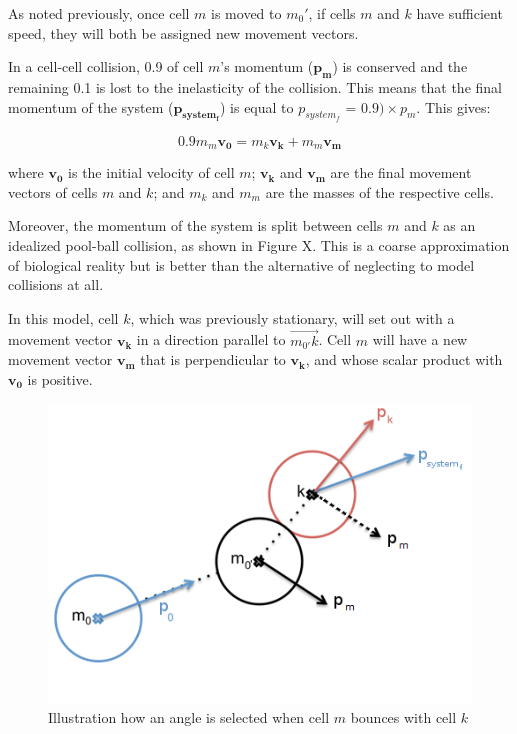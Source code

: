 \documentclass[12pt]{article}
\begin{document}
As noted previously, once cell \(m\) is moved to \(m_0'\), if 
cells \(m\) and \(k\) have sufficient speed, they will both be assigned new movement vectors.

In a cell-cell collision, 0.9 of cell \(m\)'s momentum (\(\mathbf{p_m}\)) is conserved and the 
remaining 0.1 is lost to the inelasticity of the collision. This means that the final momentum 
of the system (\(\mathbf{p_{system_f}}\)) is equal to \(p_{system_f}\) = \(0.9) \times p_m\). 
This gives:

\begin{equation}
  0.9m_m\mathbf{v_0} = m_k\mathbf{v_k}+m_m\mathbf{v_m}
\end{equation}

where \(\mathbf{v_0}\) is the initial velocity of cell \(m\);
\(\mathbf{v_k}\) and \(\mathbf{v_m}\) are the final movement vectors of cells \(m\) and \(k\); and \(m_k\) and
\(m_m\) are the masses of the respective cells.

Moreover, the momentum of the system is split between cells \(m\) and \(k\) as an idealized 
pool-ball collision, as shown in Figure X. This is a coarse approximation of biological 
reality but is better than the alternative of neglecting to model collisions at all. 

In this model, cell \(k\), which was previously stationary, will 
set out with a movement vector \(\mathbf{v_k}\) in a direction parallel to \(\overrightarrow{m_{0'}k}\).
Cell \(m\) will have a new movement vector \(\mathbf{v_m}\) 
that is perpendicular to \(\mathbf{v_k}\), and whose scalar product with \(\mathbf{v_0}\) 
is positive.

\begin{figure}[H]
\centering
\includegraphics[width=13cm]{media/cellcollide.png}
\caption{Illustration how an angle is selected when cell \(m\) bounces with cell \(k\)}
\end{figure}
\end{document}
